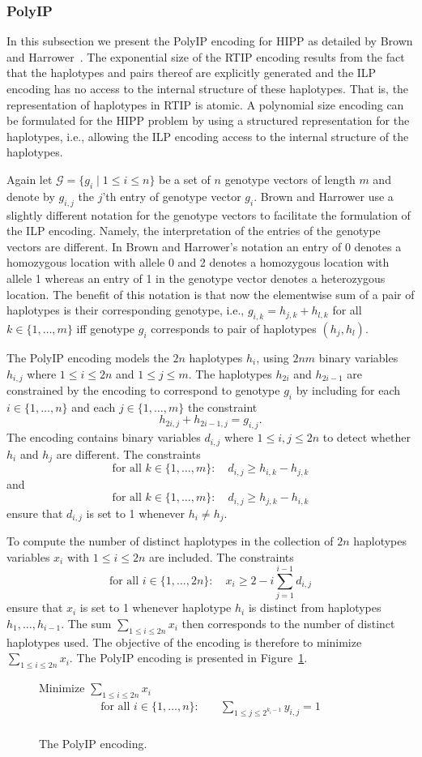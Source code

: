\documentclass[12pt,a4paper]{article}
\begin{document}
\subsubsection{PolyIP}
In this subsection we present the PolyIP encoding for HIPP as detailed by Brown and Harrower~\cite{DBLP:journals/tcbb/BrownH06}.
The exponential size of the RTIP encoding results from the fact that the haplotypes and pairs thereof are explicitly generated and the ILP encoding has no access to the internal structure of these haplotypes.
That is, the representation of haplotypes in RTIP is atomic.
A polynomial size encoding can be formulated for the HIPP problem by using a structured representation for the haplotypes, i.e., allowing the ILP encoding access to the internal structure of the haplotypes.

Again let $\mathcal{G}=\{g_i\mid 1\leq i \leq n\}$ be a set of $n$ genotype vectors of length $m$ and denote by $g_{i,j}$ the $j$'th entry of genotype vector $g_i$.
Brown and Harrower use a slightly different notation for the genotype vectors to facilitate the formulation of the ILP encoding.
Namely, the interpretation of the entries of the genotype vectors are different.
In Brown and Harrower's notation an entry of 0 denotes a homozygous location with allele 0 and 2 denotes a homozygous location with allele 1 whereas 
an entry of 1 in the genotype vector denotes a heterozygous location.
The benefit of this notation is that now the elementwise sum of a pair of haplotypes is their corresponding genotype, i.e., $g_{i,k} = h_{j, k} + h_{l, k}$ for all $k\in\{1,\dots ,m\}$ iff genotype $g_i$ corresponds to pair of haplotypes $(h_{j}, h_{l})$.

The PolyIP encoding models the $2n$ haplotypes $h_i$, using $2nm$ binary variables $h_{i,j}$ where $1\leq i \leq 2n$ and $1\leq j \leq m$.
The haplotypes $h_{2i}$ and $h_{2i-1}$ are constrained by the encoding to correspond to genotype $g_i$ by including for each $i\in\{1, \dots , n\}$ and each $j\in\{1,\dots ,m\}$ the constraint
$$ h_{2i,j} + h_{2i-1,j} = g_{i,j}. $$
The encoding contains binary variables $d_{i,j}$ where $1\leq i,j\leq 2n$ to detect whether $h_i$ and $h_j$ are different.
The constraints 
$$ \text{for all }k\in\{1,\dots ,m\}:\quad  d_{i,j} \geq h_{i,k}-h_{j,k} $$
and
$$ \text{for all }k\in\{1,\dots ,m\}:\quad  d_{i,j} \geq h_{j,k}-h_{i,k} $$
ensure that $d_{i,j}$ is set to 1 whenever $h_i\neq h_j$.

To compute the number of distinct haplotypes in the collection of $2n$ haplotypes variables $x_i$ with $1\leq i\leq 2n$ are included.
The constraints
$$ \text{for all }i\in\{1,\dots ,2n\}:\quad  x_{i} \geq 2 - i \sum_{j=1}^{i-1} d_{i,j} $$
ensure that $x_i$ is set to 1 whenever haplotype $h_i$ is distinct from haplotypes $h_1,\dots , h_{i-1}$.
The sum $\sum_{1\leq i\leq 2n} x_i$ then corresponds to the number of distinct haplotypes used.
The objective of the encoding is therefore to minimize $\sum_{1\leq i\leq 2n} x_i$.
The PolyIP encoding is presented in Figure~\ref{fig:enc-polyip}.

\begin{figure}
\centering
Minimize $\sum_{1\leq i \leq 2n} x_i$
\begin{align}
\text{for all  }i\in\{1,\dots , n\}:&\quad \sum_{1\leq j \leq 2^{k_i-1}} y_{i,j} = 1 \\
\end{align}
\caption{The PolyIP encoding.}
\label{fig:enc-polyip}
\end{figure}





\end{document}
